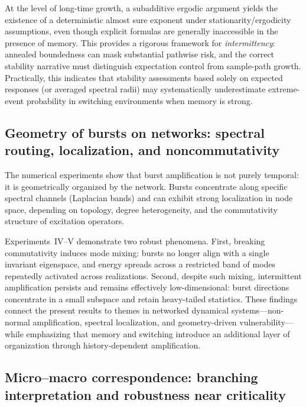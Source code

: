 \documentclass[12pt,a4paper]{article}
\theoremstyle{plain}
\theoremstyle{definition}
\theoremstyle{remark}
\begin{document}
At the level of long-time growth, a subadditive ergodic argument yields the
existence of a deterministic almost sure exponent under
stationarity/ergodicity assumptions, even though explicit formulas are generally
inaccessible in the presence of memory.
This provides a rigorous framework for \emph{intermittency}:
annealed boundedness can mask substantial pathwise risk, and the correct
stability narrative must distinguish expectation control from sample-path growth.
Practically, this indicates that stability assessments based solely on expected
responses (or averaged spectral radii) may systematically underestimate
extreme-event probability in switching environments when memory is strong.

\subsection*{Geometry of bursts on networks: spectral routing, localization, and noncommutativity}

The numerical experiments show that burst amplification is not purely temporal:
it is geometrically organized by the network.
Bursts concentrate along specific spectral channels (Laplacian bands) and can
exhibit strong localization in node space, depending on topology, degree
heterogeneity, and the commutativity structure of excitation operators.

Experiments~IV--V demonstrate two robust phenomena.
First, breaking commutativity induces mode mixing: bursts no longer align with a
single invariant eigenspace, and energy spreads across a restricted band of
modes repeatedly activated across realizations.
Second, despite such mixing, intermittent amplification persists and remains
effectively low-dimensional: burst directions concentrate in a small subspace and
retain heavy-tailed statistics.
These findings connect the present results to themes in networked dynamical
systems---non-normal amplification, spectral localization, and geometry-driven
vulnerability---while emphasizing that memory and switching introduce an
additional layer of organization through history-dependent amplification.

\subsection*{Micro--macro correspondence: branching interpretation and robustness near criticality}
\end{document}
